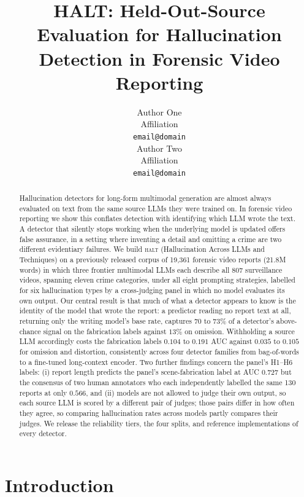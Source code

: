 \documentclass{article}
\title{HALT: Held-Out-Source Evaluation for
\mbox{Hallucination} Detection in Forensic Video Reporting}
\author{
Author One \\
Affiliation \\
\texttt{email@domain} \\
\And
Author Two \\
Affiliation \\
\texttt{email@domain}
}
\begin{document}
\maketitle

\begin{abstract}
Hallucination detectors for long-form multimodal generation are almost always
evaluated on text from the same source LLMs they were trained on. In forensic
video reporting we show this conflates detection with identifying which LLM
wrote the text. A detector that silently stops working when the underlying
model is updated offers false assurance, in a setting where inventing a detail
and omitting a crime are two different evidentiary failures. We build
\textsc{halt} (Hallucination Across LLMs and Techniques) on a previously
released corpus of 19{,}361 forensic video reports (21.8M words) in which
three frontier multimodal LLMs each describe all 807 surveillance videos,
spanning eleven crime categories, under all eight prompting strategies,
labelled for six hallucination types by a cross-judging panel in which no
model evaluates its own output. Our central result is that
much of what a detector appears to know is the identity of the model that
wrote the report: a predictor reading no report text at all, returning only
the writing model's base rate, captures $70$ to $73\%$ of a detector's
above-chance signal on the fabrication labels against $13\%$ on omission. Withholding a source LLM accordingly costs the fabrication labels $0.104$ to
$0.191$ AUC against $0.035$ to $0.105$ for omission and distortion,
consistently across four detector families from bag-of-words to a fine-tuned
long-context encoder. Two
further findings concern the panel's H1--H6 labels: (i) report length predicts
the panel's scene-fabrication label at AUC $0.727$ but the consensus of two
human annotators who each independently labelled the same 130 reports at only
$0.566$, and (ii) models are not allowed to
judge their own output, so each source LLM is scored by a different pair of
judges; those pairs differ in how often they agree, so comparing hallucination
rates across models partly compares their judges. We release the reliability tiers, the four splits, and
reference implementations of every detector.
\end{abstract}

\section{Introduction}
\end{document}
